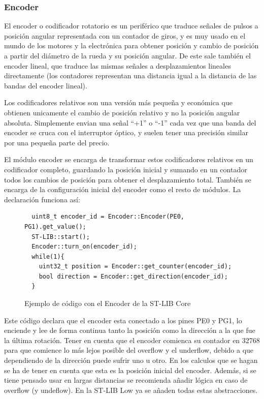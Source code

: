 \documentclass{report}
\begin{document}
\subsubsection{Encoder}
El encoder o codificador rotatorio es un periférico que traduce señales de pulsos a posición angular representada con un contador de giros, y es muy usado en el mundo de los motores y la electrónica para obtener posición y cambio de posición a partir del diámetro de la rueda y su posición angular. De este sale también el encoder lineal, que traduce las mismas señales a desplazamientos lineales directamente (los contadores representan una distancia igual a la distancia de las bandas del encoder lineal). \par
Los codificadores relativos son una versión más pequeña y económica que obtienen unicamente el cambio de posición relativo y no la posición angular absoluta. Simplemente envian una señal ``+1'' o ``-1'' cada vez que una banda del encoder se cruca con el interruptor óptico, y suelen tener una precisión similar por una pequeña parte del precio. \par \vspace{0.3cm}
El módulo encoder se encarga de transformar estos codificadores relativos en un codificador completo, guardando la posición inicial y sumando en un contador todos los cambios de posición para obtener el desplazamiento total. También se encarga de la configuración inicial del encoder como el resto de módulos. La declaración funciona así:
\begin{figure}[h]
\begin{lstlisting}
  uint8_t encoder_id = Encoder::Encoder(PE0, PG1).get_value();
  ST-LIB::start();
  Encoder::turn_on(encoder_id);
  while(1){
    uint32_t position = Encoder::get_counter(encoder_id);
    bool direction = Encoder::get_direction(encoder_id);
  }
\end{lstlisting}
\caption{Ejemplo de código con el Encoder de la ST-LIB Core}
  \label{Encodercode}
\end{figure}
\par \vspace{0.3cm}
Este código declara que el encoder esta conectado a los pines PE0 y PG1, lo enciende y lee de forma continua tanto la posición como la dirección a la que fue la última rotación. Tener en cuenta que el encoder comienca su contador en 32768 para que comience lo más lejos posible del overflow y el underflow, debido a que dependiendo de la dirección puede sufrir uno u otro. En los calculos que se hagan se ha de tener en cuenta que esta es la posición inicial del encoder. Además, si se tiene pensado usar en largas distancias se recomienda añadir lógica en caso de overflow (y undeflow). En la ST-LIB Low ya se añaden todas estas abstracciones.
\end{document}
